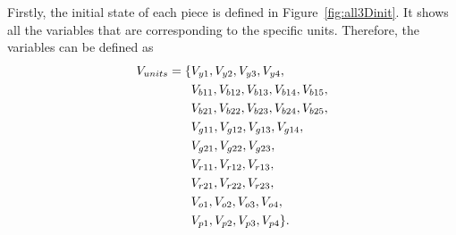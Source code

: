 Firstly, the initial state of each piece is defined in Figure~\ref{fig:all3Dinit}.
It shows all the variables that are corresponding to the specific units. Therefore, the variables can be defined as
\begin{equation}
\begin{aligned}
V_{units}=\{&V_{y1},V_{y2},V_{y3},V_{y4},\\&V_{b11},V_{b12},V_{b13},V_{b14},
V_{b15},\\&V_{b21},V_{b22},V_{b23},V_{b24},V_{b25},\\&V_{g11},V_{g12},V_{g13},V_{g14},\\&V_{g21},V_{g22},V_{g23},\\&V_{r11},
V_{r12},V_{r13},\\&V_{r21},V_{r22},V_{r23},\\&V_{o1},V_{o2},V_{o3},V_{o4},\\&V_{p1},V_{p2},V_{p3},V_{p4}\}.
\end{aligned}
\end{equation}
